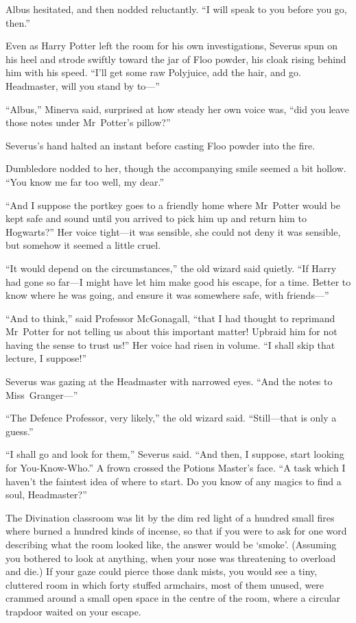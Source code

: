 Albus hesitated, and then nodded reluctantly. “I will speak to you before you go, then.”

\later

Even as Harry Potter left the room for his own investigations, Severus spun on his heel and strode swiftly toward the jar of Floo powder, his cloak rising behind him with his speed. “I’ll get some raw Polyjuice, add the hair, and go. Headmaster, will you stand by to—”

“Albus,” Minerva said, surprised at how steady her own voice was, “did you leave those notes under Mr~Potter’s pillow?”

Severus’s hand halted an instant before casting Floo powder into the fire.

Dumbledore nodded to her, though the accompanying smile seemed a bit hollow. “You know me far too well, my dear.”

“And I suppose the portkey goes to a friendly home where Mr~Potter would be kept safe and sound until you arrived to pick him up and return him to Hogwarts?” Her voice tight—it was sensible, she could not deny it was sensible, but somehow it seemed a little cruel.

“It would depend on the circumstances,” the old wizard said quietly. “If Harry had gone so far—I might have let him make good his escape, for a time. Better to know where he was going, and ensure it was somewhere safe, with friends—”

“And to think,” said Professor McGonagall, “that I had thought to reprimand Mr~Potter for not telling us about this important matter! Upbraid him for not having the sense to trust us!” Her voice had risen in volume. “I shall skip that lecture, I suppose!”

Severus was gazing at the Headmaster with narrowed eyes. “And the notes to Miss~Granger—”

“The Defence Professor, very likely,” the old wizard said. “Still—that is only a guess.”

“I shall go and look for them,” Severus said. “And then, I suppose, start looking for You-Know-Who.” A frown crossed the Potions Master’s face. “A task which I haven’t the faintest idea of where to start. Do you know of any magics to find a soul, Headmaster?”

\later

The Divination classroom was lit by the dim red light of a hundred small fires where burned a hundred kinds of incense, so that if you were to ask for one word describing what the room looked like, the answer would be ‘smoke’. (Assuming you bothered to look at anything, when your nose was threatening to overload and die.) If your gaze could pierce those dank mists, you would see a tiny, cluttered room in which forty stuffed armchairs, most of them unused, were crammed around a small open space in the centre of the room, where a circular trapdoor waited on your escape.


